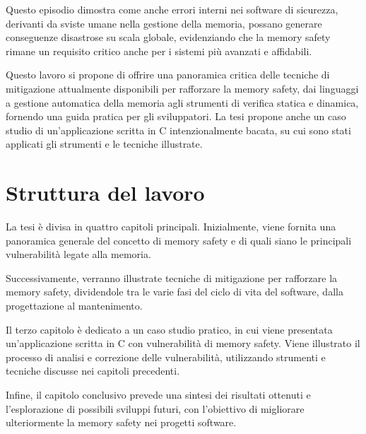 Questo episodio dimostra come anche errori interni nei software di sicurezza, derivanti
da sviste umane nella gestione della memoria, possano generare conseguenze
disastrose su scala globale, evidenziando che la memory safety rimane un requisito
critico anche per i sistemi più avanzati e affidabili.

\bigskip
\noindent
Questo lavoro si propone di offrire una panoramica critica delle tecniche di mitigazione
attualmente disponibili per rafforzare la memory safety, dai linguaggi a
gestione automatica della memoria agli strumenti di verifica statica e dinamica,
fornendo una guida pratica per gli sviluppatori. La tesi propone anche un caso
studio di un'applicazione scritta in C intenzionalmente bacata, su cui sono stati
applicati gli strumenti e le tecniche illustrate.

\section*{Struttura del lavoro}
\label{sec:structure} La tesi è divisa in quattro capitoli principali.
Inizialmente, viene fornita una panoramica generale del concetto di memory safety
e di quali siano le principali vulnerabilità legate alla memoria.

Successivamente, verranno illustrate tecniche di mitigazione per rafforzare la
memory safety, dividendole tra le varie fasi del ciclo di vita del software,
dalla progettazione al mantenimento.

Il terzo capitolo è dedicato a un caso studio pratico, in cui viene presentata un'applicazione
scritta in C con vulnerabilità di memory safety. Viene illustrato il processo di
analisi e correzione delle vulnerabilità, utilizzando strumenti e tecniche discusse
nei capitoli precedenti.

Infine, il capitolo conclusivo prevede una sintesi dei risultati ottenuti e l'esplorazione
di possibili sviluppi futuri, con l'obiettivo di migliorare ulteriormente la memory
safety nei progetti software.